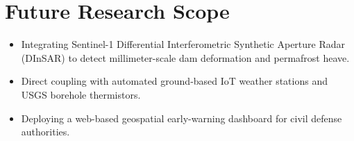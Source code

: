 \documentclass[12pt,a4paper]{report}
\begin{document}
\section{Future Research Scope}
\begin{itemize}
    \item Integrating Sentinel-1 Differential Interferometric Synthetic Aperture Radar (DInSAR) to detect millimeter-scale dam deformation and permafrost heave.
    \item Direct coupling with automated ground-based IoT weather stations and USGS borehole thermistors.
    \item Deploying a web-based geospatial early-warning dashboard for civil defense authorities.
\end{itemize}


\end{document}
